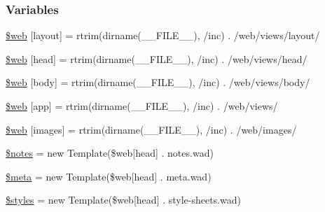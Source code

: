 \subsubsection*{Variables}
\begin{DoxyCompactItemize}
\item 
\hyperlink{namespace_w_a_f_f_l_e_1_1_controller_addf129be55acc267c327e86398d34ac5}{\$web} \mbox{[}\textquotesingle{}layout\textquotesingle{}\mbox{]} = rtrim(dirname(\+\_\+\+\_\+\+F\+I\+L\+E\+\_\+\+\_\+), \textquotesingle{}/inc\textquotesingle{}) . \textquotesingle{}/web/views/layout/\textquotesingle{}
\item 
\hyperlink{namespace_w_a_f_f_l_e_1_1_controller_a1d17c9f36b6261d10ed0564bc749f629}{\$web} \mbox{[}\textquotesingle{}head\textquotesingle{}\mbox{]} = rtrim(dirname(\+\_\+\+\_\+\+F\+I\+L\+E\+\_\+\+\_\+), \textquotesingle{}/inc\textquotesingle{}) . \textquotesingle{}/web/views/head/\textquotesingle{}
\item 
\hyperlink{namespace_w_a_f_f_l_e_1_1_controller_a119f09626762a89e6abf1852ee071671}{\$web} \mbox{[}\textquotesingle{}body\textquotesingle{}\mbox{]} = rtrim(dirname(\+\_\+\+\_\+\+F\+I\+L\+E\+\_\+\+\_\+), \textquotesingle{}/inc\textquotesingle{}) . \textquotesingle{}/web/views/body/\textquotesingle{}
\item 
\hyperlink{namespace_w_a_f_f_l_e_1_1_controller_ade212434c225bbfae525dc5ec32399c3}{\$web} \mbox{[}\textquotesingle{}app\textquotesingle{}\mbox{]} = rtrim(dirname(\+\_\+\+\_\+\+F\+I\+L\+E\+\_\+\+\_\+), \textquotesingle{}/inc\textquotesingle{}) . \textquotesingle{}/web/views/\textquotesingle{}
\item 
\hyperlink{namespace_w_a_f_f_l_e_1_1_controller_aa973df704de61f7d3bb7b360b1824901}{\$web} \mbox{[}\textquotesingle{}images\textquotesingle{}\mbox{]} = rtrim(dirname(\+\_\+\+\_\+\+F\+I\+L\+E\+\_\+\+\_\+), \textquotesingle{}/inc\textquotesingle{}) . \textquotesingle{}/web/images/\textquotesingle{}
\item 
\hyperlink{namespace_w_a_f_f_l_e_1_1_controller_a2bfacb2c81cae66264f765b0a20599c6}{\$notes} = new Template(\$web\mbox{[}\textquotesingle{}head\textquotesingle{}\mbox{]} . \textquotesingle{}notes.\+wad\textquotesingle{})
\item 
\hyperlink{namespace_w_a_f_f_l_e_1_1_controller_a9e6fc1ae0498be7d1e682f8bcc9299df}{\$meta} = new Template(\$web\mbox{[}\textquotesingle{}head\textquotesingle{}\mbox{]} . \textquotesingle{}meta.\+wad\textquotesingle{})
\item 
\hyperlink{namespace_w_a_f_f_l_e_1_1_controller_a920c320068535c09e154c6707eb42ded}{\$styles} = new Template(\$web\mbox{[}\textquotesingle{}head\textquotesingle{}\mbox{]} . \textquotesingle{}style-\/sheets.\+wad\textquotesingle{})

\end{DoxyCompactItemize}
